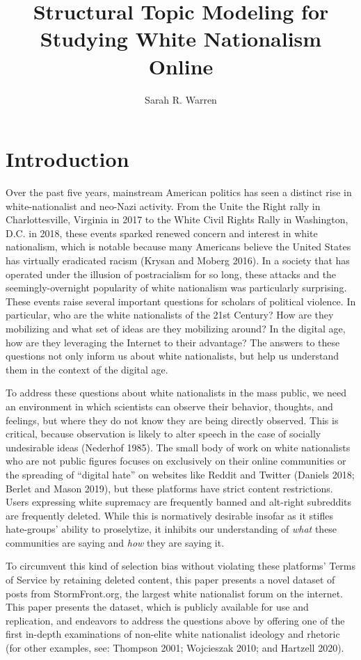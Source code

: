 \documentclass[12pt]{paper}
\title{Structural Topic Modeling for Studying White Nationalism Online}
\author{Sarah R. Warren}
\date{}
\begin{document}
\maketitle

\doublespacing
\section*{Introduction}
Over the past five years, mainstream American politics has seen a distinct rise in white-nationalist and neo-Nazi activity. From the Unite the Right rally in Charlottesville, Virginia in 2017 to the White Civil Rights Rally in Washington, D.C. in 2018, these events sparked renewed concern and interest in white nationalism, which is notable because many Americans believe the United States has virtually eradicated racism (Krysan and Moberg 2016). In a society that has operated under the illusion of postracialism for so long, these attacks and the seemingly-overnight popularity of white nationalism was particularly surprising. These events raise several important questions for scholars of political violence. In particular, who are the white nationalists of the 21st Century? How are they mobilizing and what set of ideas are they mobilizing around? In the digital age, how are they leveraging the Internet to their advantage? The answers to these questions not only inform us about white nationalists, but help us understand them in the context of the digital age.

To address these questions about white nationalists in the mass public, we need an environment in which scientists can observe their behavior, thoughts, and feelings, but where they do not know they are being directly observed. This is critical, because observation is likely to alter speech in the case of socially undesirable ideas (Nederhof 1985). The small body of work on white nationalists who are not public figures focuses on exclusively on their online communities or the spreading of “digital hate” on websites like Reddit and Twitter (Daniels 2018; Berlet and Mason 2019), but these platforms have strict content restrictions. Users expressing white supremacy are frequently banned and alt-right subreddits are frequently deleted. While this is normatively desirable insofar as it stifles hate-groups' ability to proselytize, it inhibits our understanding of \textit{what} these communities are saying and \textit{how} they are saying it.

To circumvent this kind of selection bias without violating these platforms’ Terms of Service by retaining deleted content, this paper presents a novel dataset of posts from StormFront.org, the largest white nationalist forum on the internet. This paper presents the dataset, which is publicly available for use and replication,  and endeavors to address the questions above by offering one of the first in-depth examinations of non-elite white nationalist ideology and rhetoric (for other examples, see: Thompson 2001; Wojcieszak 2010; and Hartzell 2020). 
\end{document}
